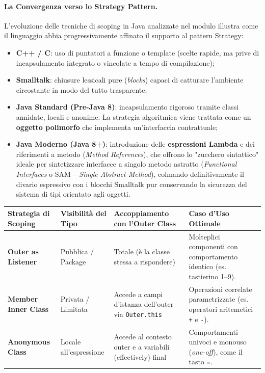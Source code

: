 \documentclass[12pt]{extarticle}
\begin{document}
\paragraph{La Convergenza verso lo Strategy Pattern.}
L'evoluzione delle tecniche di scoping in Java analizzate nel modulo illustra come il linguaggio abbia progressivamente affinato il supporto al pattern Strategy:
\begin{itemize}
    \item \textbf{C++ / C}: uso di puntatori a funzione o template (scelte rapide, ma prive di incapsulamento integrato o vincolate a tempo di compilazione);
    \item \textbf{Smalltalk}: chiusure lessicali pure (\textit{blocks}) capaci di catturare l'ambiente circostante in modo del tutto trasparente;
    \item \textbf{Java Standard (Pre-Java 8)}: incapsulamento rigoroso tramite classi annidate, locali e anonime. La strategia algoritmica viene trattata come un \textbf{oggetto polimorfo} che implementa un'interfaccia contrattuale;
    \item \textbf{Java Moderno (Java 8+)}: introduzione delle \textbf{espressioni Lambda} e dei riferimenti a metodo (\textit{Method References}), che offrono lo "zucchero sintattico" ideale per sintetizzare interfacce a singolo metodo astratto (\textit{Functional Interfaces} o SAM -- \textit{Single Abstract Method}), colmando definitivamente il divario espressivo con i blocchi Smalltalk pur conservando la sicurezza del sistema di tipi orientato agli oggetti.
\end{itemize}

\begin{center}
\small
\begin{tabular}{p{3.2cm}p{3.4cm}p{4.2cm}p{3.4cm}}
    \toprule
    \textbf{Strategia di Scoping} & \textbf{Visibilità del Tipo} & \textbf{Accoppiamento con l'Outer Class} & \textbf{Caso d'Uso Ottimale} \\
    \midrule
    \textbf{Outer as Listener} & Pubblica / Package & Totale (è la classe stessa a rispondere) & Molteplici componenti con comportamento identico (es. tastierino 1--9). \\
    \addlinespace
    \textbf{Member Inner Class} & Privata / Limitata & Accede a campi d'istanza dell'outer via \texttt{Outer.this} & Operazioni correlate parametrizzate (es. operatori aritemetici \texttt{+} e \texttt{-}). \\
    \addlinespace
    \textbf{Anonymous Class} & Locale all'espressione & Accede al contesto outer e a variabili (effectively) final & Comportamenti univoci e monouso (\textit{one-off}), come il tasto \texttt{=}. \\
    \bottomrule
\end{tabular}
\end{center}
\end{document}
